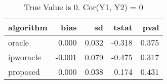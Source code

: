 \begin{table}[h!]

\caption{True Value is 0. Cor(Y1, Y2) = 0}
\centering
\begin{tabular}[t]{lrrrr}
\toprule
algorithm & bias & sd & tstat & pval\\
\midrule
oracle & 0.000 & 0.032 & -0.318 & 0.375\\
ipworacle & -0.001 & 0.079 & -0.475 & 0.317\\
proposed & 0.000 & 0.038 & 0.174 & 0.431\\
\bottomrule
\end{tabular}
\end{table}
